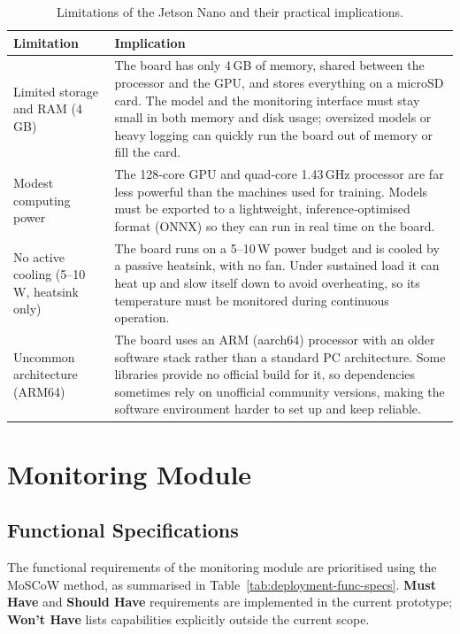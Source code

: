 \begin{table}[H]
\centering
\caption{Limitations of the Jetson Nano and their practical implications.}
\label{tab:jetson_nano_limitations}
\begin{tabular}{@{}p{5cm}p{10cm}@{}}
\toprule
\textbf{Limitation} & \textbf{Implication} \\
\midrule
Limited storage and RAM (4\,GB) & The board has only 4\,GB of memory, shared between the processor and the GPU, and stores everything on a microSD card. The model and the monitoring interface must stay small in both memory and disk usage; oversized models or heavy logging can quickly run the board out of memory or fill the card. \\
\midrule
Modest computing power & The 128‑core GPU and quad‑core 1.43\,GHz processor are far less powerful than the machines used for training. Models must be exported to a lightweight, inference‑optimised format (ONNX) so they can run in real time on the board. \\
\midrule
No active cooling (5--10\,W, heatsink only) & The board runs on a 5--10\,W power budget and is cooled by a passive heatsink, with no fan. Under sustained load it can heat up and slow itself down to avoid overheating, so its temperature must be monitored during continuous operation. \\
\midrule
Uncommon architecture (ARM64) & The board uses an ARM (aarch64) processor with an older software stack rather than a standard PC architecture. Some libraries provide no official build for it, so dependencies sometimes rely on unofficial community versions, making the software environment harder to set up and keep reliable. \\
\bottomrule
\end{tabular}
\end{table}

\section{Monitoring Module}
\label{sec:deployment-module}

\subsection{Functional Specifications}
\label{sec:deployment-func-specs}

The functional requirements of the monitoring module are prioritised using the MoSCoW method, as summarised in Table~\ref{tab:deployment-func-specs}. \textbf{Must Have} and \textbf{Should Have} requirements are implemented in the current prototype; \textbf{Won't Have} lists capabilities explicitly outside the current scope.

